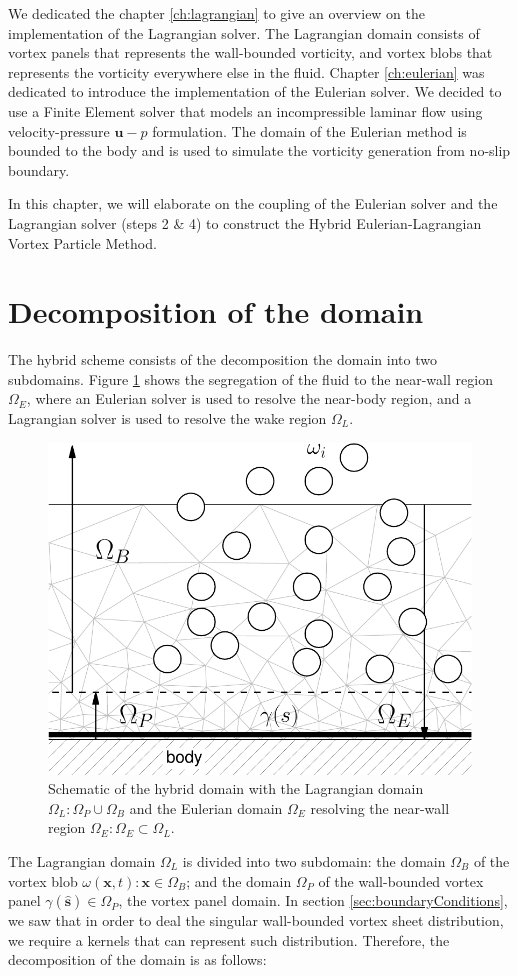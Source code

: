 We dedicated the chapter \ref{ch:lagrangian} to give an overview on the implementation of the Lagrangian solver. The Lagrangian domain consists of vortex panels that represents the wall-bounded vorticity, and vortex blobs that represents the vorticity everywhere else in the fluid. Chapter \ref{ch:eulerian} was dedicated to introduce the implementation of the Eulerian solver. We decided to use a Finite Element solver that models an incompressible laminar flow using velocity-pressure $\mathbf{u}-p$ formulation. The domain of the Eulerian method is bounded to the body and is used to simulate the vorticity generation from no-slip boundary.

In this chapter, we will elaborate on the coupling of the Eulerian solver and the Lagrangian solver (steps 2 \& 4) to construct the Hybrid Eulerian-Lagrangian Vortex Particle Method. 

\section{Decomposition of the domain}
The hybrid scheme consists  of the decomposition the domain into two subdomains. Figure \ref{fig:hybrid_domains} shows the segregation of the fluid to the near-wall region $\Omega_E$, where an Eulerian solver is used to resolve the near-body region, and a Lagrangian solver is used to resolve the wake region $\Omega_L$.
	\begin{figure}[b]
	\centering
	\includegraphics[width=0.45\linewidth]{./figures/hybrid/interpolation/hybrid_domains-crop.pdf}
	\caption{Schematic of the hybrid domain with the Lagrangian domain $\Omega_L: \Omega_P \cup \Omega_B$ and the Eulerian domain $\Omega_E$ resolving the near-wall region $\Omega_E: \Omega_E \subset \Omega_L$.}
	\label{fig:hybrid_domains}
	\end{figure}

The Lagrangian domain $\Omega_L$ is divided into two subdomain: the domain $\Omega_B$ of the vortex blob $\omega(\mathbf{x},t): \mathbf{x} \in \Omega_B$; and the domain $\Omega_P$ of the wall-bounded vortex panel $\gamma(\mathbf{\hat{s}}) \in \Omega_{P}$, the vortex panel domain. In section \ref{sec:boundaryConditions}, we saw that in order to deal the singular wall-bounded vortex sheet distribution, we require a kernels that can represent such distribution. Therefore, the decomposition of the domain is as follows:

